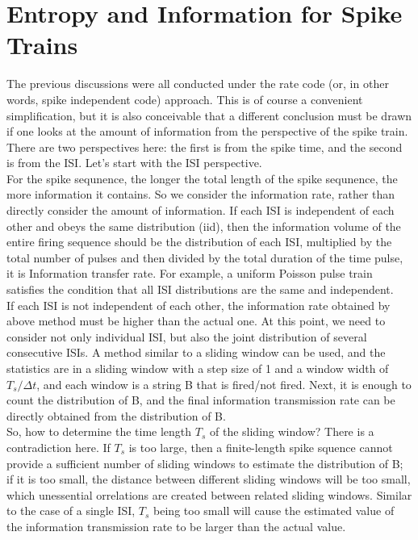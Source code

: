 \section{Entropy and Information for Spike Trains}
\label{sec:Entropy and Information for Spike Trains}

The previous discussions were all conducted under the rate code (or,
in other words, spike independent code) approach. This is of course a
convenient simplification, but it is also conceivable that a different
conclusion must be drawn if one looks at the amount of information
from the perspective of the spike train. There are two perspectives
here: the first is from the spike time, and the second is from the
ISI. Let's start with the ISI perspective.\\

For the spike sequnence, the longer the total length of the spike
sequnence, the more information it contains. So we consider the
information rate, rather than directly consider the amount of
information. If each ISI is independent of each other and obeys the
same distribution (iid), then the information volume of the entire
firing sequence should be the distribution of each ISI, multiplied by
the total number of pulses and then divided by the total duration of
the time pulse, it is Information transfer rate. For example, a
uniform Poisson pulse train satisfies the condition that all ISI
distributions are the same and independent.\\

If each ISI is not independent of each other, the information rate
obtained by above method must be higher than the actual one. At this
point, we need to consider not only individual ISI, but also the joint
distribution of several consecutive ISIs. A method similar to a
sliding window can be used, and the statistics are in a sliding window
with a step size of 1 and a window width of $T_s/\Delta t$, and each
window is a string B that is fired/not fired. Next, it is enough to
count the distribution of B, and the final information transmission
rate can be directly obtained from the distribution of B.\\

So, how to determine the time length $T_s$ of the sliding window?
There is a contradiction here. If $T_s$ is too large, then a
finite-length spike squence cannot provide a sufficient number of
sliding windows to estimate the distribution of B; if it is too small,
the distance between different sliding windows will be too small,
which unessential orrelations are created between related sliding
windows. Similar to the case of a single ISI, $T_s$ being too small
will cause the estimated value of the information transmission rate to
be larger than the actual value.\\

